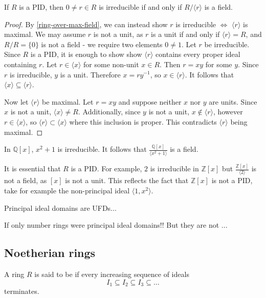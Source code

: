 \begin{prop}\label{PID-over-irreducible-is-field}
If $R$ is a PID, then $0\neq r\in R$ is irreducible if and only if $R/\langle r\rangle$ is a field.
\end{prop}
\begin{proof}
By \cref{ring-over-max-field}, we can instead show $r$ is irreducible $\iff$ $\langle r\rangle$ is maximal. We may assume $r$ is not a unit, as $r$ is a unit if and only if $\langle r\rangle=R$, and $R/R=\{0\}$ is not a field - we require two elements $0\neq 1$. Let $r$ be irreducible. Since $R$ is a PID, it is enough to show show $\langle r\rangle$ contains every proper ideal containing $r$. Let $r\in \langle x\rangle$ for some non-unit $x\in R$. Then $r=xy$ for some $y$. Since $r$ is irreducible, $y$ is a unit. Therefore $x=ry^{-1}$, so $x\in \langle r\rangle$. It follows that $\langle x\rangle \subseteq \langle r\rangle$.

Now let $\langle r \rangle$ be maximal. Let $r=xy$ and suppose neither $x$ nor $y$ are units. Since $x$ is not a unit, $\langle x\rangle \neq R$. Additionally, since $y$ is not a unit, $x\not \in \langle r\rangle$, however $r\in \langle x\rangle$, so $\langle r\rangle \subset \langle x\rangle$ where this inclusion is proper. This contradicts $\langle r\rangle$ being maximal.
\end{proof}

\begin{example}
In $\mathbb{Q}[x]$, $x^2+1$ is irreducible. It follows that $\frac{\mathbb{Q}[x]}{\langle x^2+1\rangle}$ is a field. 
\end{example}

\begin{remark}
It is essential that $R$ is a PID. For example, $2$ is irreducible in $\mathbb{Z}[x]$ but $\frac{\mathbb{Z}[x]}{\langle 2\rangle}$ is not a field, as $[x]$ is not a unit. This reflects the fact that $\mathbb{Z}[x]$ is not a PID, take for example the non-principal ideal $\langle 1,x^2\rangle$.
\end{remark}

Principal ideal domains are UFDs...

If only number rings were principal ideal domains!! But they are not ...

\subsection{Noetherian rings}

\begin{definition}
A ring $R$ is said to be  if every increasing sequence of ideals $$I_1\subseteq I_2\subseteq I_3 \subseteq \dots$$
terminates.
\end{definition}

